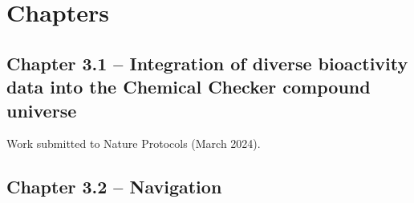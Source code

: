 
\chapter{Chapters}
\newpage



\section[Integration of diverse bioactivity data into the Chemical Checker compound universe]{Chapter 3.1 -- Integration of diverse bioactivity data into the Chemical Checker compound universe}
\setcounter{figure}{0}
\renewcommand{\thefigure}{3.\arabic{section}.\arabic{figure}}
\hspace*{\fill} Work submitted to Nature Protocols (March 2024).






\newpage



\section[A]{Chapter 3.2 -- Navigation}
\renewcommand{\thefigure}{3.\arabic{section}.\arabic{figure}}





\newpage



